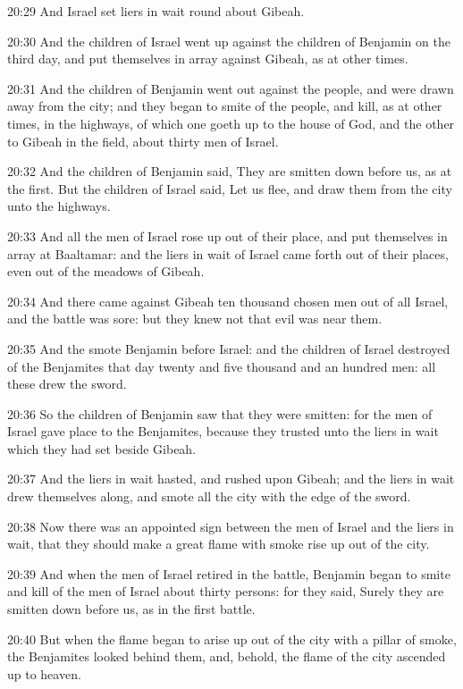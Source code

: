 20:29 And Israel set liers in wait round about Gibeah.

20:30 And the children of Israel went up against the children of
Benjamin on the third day, and put themselves in array against Gibeah,
as at other times.

20:31 And the children of Benjamin went out against the people, and
were drawn away from the city; and they began to smite of the people,
and kill, as at other times, in the highways, of which one goeth up to
the house of God, and the other to Gibeah in the field, about thirty
men of Israel.

20:32 And the children of Benjamin said, They are smitten down before
us, as at the first. But the children of Israel said, Let us flee, and
draw them from the city unto the highways.

20:33 And all the men of Israel rose up out of their place, and put
themselves in array at Baaltamar: and the liers in wait of Israel came
forth out of their places, even out of the meadows of Gibeah.

20:34 And there came against Gibeah ten thousand chosen men out of all
Israel, and the battle was sore: but they knew not that evil was near
them.

20:35 And the \LORD smote Benjamin before Israel: and the children of
Israel destroyed of the Benjamites that day twenty and five thousand
and an hundred men: all these drew the sword.

20:36 So the children of Benjamin saw that they were smitten: for the
men of Israel gave place to the Benjamites, because they trusted unto
the liers in wait which they had set beside Gibeah.

20:37 And the liers in wait hasted, and rushed upon Gibeah; and the
liers in wait drew themselves along, and smote all the city with the
edge of the sword.

20:38 Now there was an appointed sign between the men of Israel and
the liers in wait, that they should make a great flame with smoke rise
up out of the city.

20:39 And when the men of Israel retired in the battle, Benjamin began
to smite and kill of the men of Israel about thirty persons: for they
said, Surely they are smitten down before us, as in the first battle.

20:40 But when the flame began to arise up out of the city with a
pillar of smoke, the Benjamites looked behind them, and, behold, the
flame of the city ascended up to heaven.

